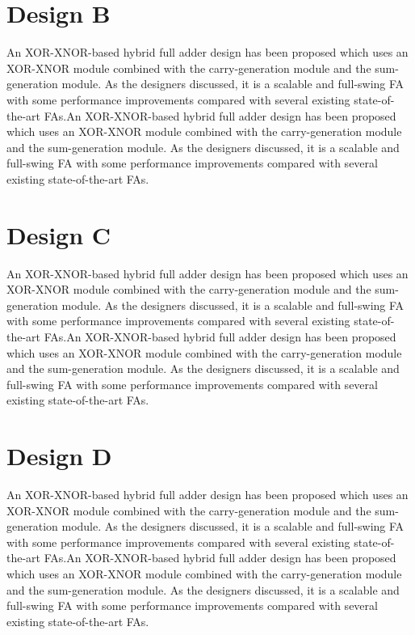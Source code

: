 \documentclass[conference]{IEEEtran}
\begin{document}
\section{Design B}

An XOR-XNOR-based hybrid full adder design has been proposed\cite{20212210429416}
which uses an XOR-XNOR module combined with the carry-generation module and the sum-generation module.
As the designers discussed, it is a scalable and full-swing FA
with some performance improvements compared with several existing state-of-the-art FAs.An XOR-XNOR-based hybrid full adder design has been proposed\cite{20212210429416}
which uses an XOR-XNOR module combined with the carry-generation module and the sum-generation module.
As the designers discussed, it is a scalable and full-swing FA
with some performance improvements compared with several existing state-of-the-art FAs.

\section{Design C}

An XOR-XNOR-based hybrid full adder design has been proposed\cite{20212210429416}
which uses an XOR-XNOR module combined with the carry-generation module and the sum-generation module.
As the designers discussed, it is a scalable and full-swing FA
with some performance improvements compared with several existing state-of-the-art FAs.An XOR-XNOR-based hybrid full adder design has been proposed\cite{20212210429416}
which uses an XOR-XNOR module combined with the carry-generation module and the sum-generation module.
As the designers discussed, it is a scalable and full-swing FA
with some performance improvements compared with several existing state-of-the-art FAs.

\section{Design D}

An XOR-XNOR-based hybrid full adder design has been proposed\cite{20212210429416}
which uses an XOR-XNOR module combined with the carry-generation module and the sum-generation module.
As the designers discussed, it is a scalable and full-swing FA
with some performance improvements compared with several existing state-of-the-art FAs.An XOR-XNOR-based hybrid full adder design has been proposed\cite{20212210429416}
which uses an XOR-XNOR module combined with the carry-generation module and the sum-generation module.
As the designers discussed, it is a scalable and full-swing FA
with some performance improvements compared with several existing state-of-the-art FAs.
\end{document}
